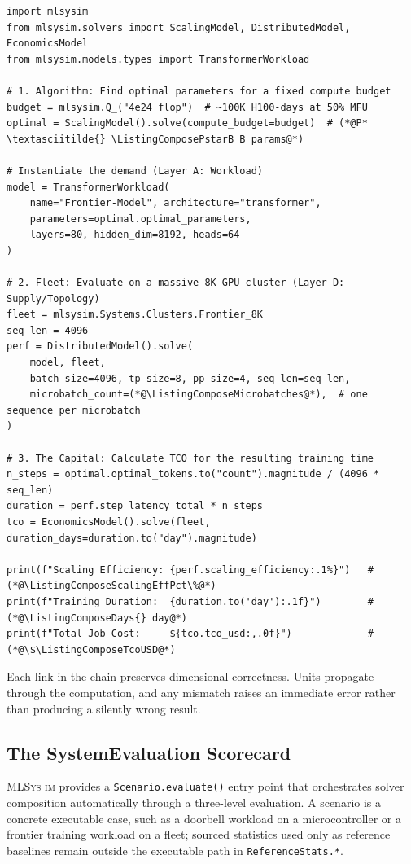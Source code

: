 \documentclass[10pt,twocolumn]{article}
\newcommand{\mlsysim}{\mbox{\textsc{MLSys}\,\textperiodcentered\,\textsc{im}}\xspace}
\begin{document}
\begin{lstlisting}[caption={\textbf{Solver Composition.} Bridging algorithmic scaling, distributed execution, and fleet economics in a single executable chain.},label={lst:composability},float=t]
import mlsysim
from mlsysim.solvers import ScalingModel, DistributedModel, EconomicsModel
from mlsysim.models.types import TransformerWorkload

# 1. Algorithm: Find optimal parameters for a fixed compute budget
budget = mlsysim.Q_("4e24 flop")  # ~100K H100-days at 50% MFU
optimal = ScalingModel().solve(compute_budget=budget)  # (*@P* \textasciitilde{} \ListingComposePstarB B params@*)

# Instantiate the demand (Layer A: Workload)
model = TransformerWorkload(
    name="Frontier-Model", architecture="transformer",
    parameters=optimal.optimal_parameters,
    layers=80, hidden_dim=8192, heads=64
)

# 2. Fleet: Evaluate on a massive 8K GPU cluster (Layer D: Supply/Topology)
fleet = mlsysim.Systems.Clusters.Frontier_8K
seq_len = 4096
perf = DistributedModel().solve(
    model, fleet,
    batch_size=4096, tp_size=8, pp_size=4, seq_len=seq_len,
    microbatch_count=(*@\ListingComposeMicrobatches@*),  # one sequence per microbatch
)

# 3. The Capital: Calculate TCO for the resulting training time
n_steps = optimal.optimal_tokens.to("count").magnitude / (4096 * seq_len)
duration = perf.step_latency_total * n_steps
tco = EconomicsModel().solve(fleet, duration_days=duration.to("day").magnitude)

print(f"Scaling Efficiency: {perf.scaling_efficiency:.1%}")   # (*@\ListingComposeScalingEffPct\%@*)
print(f"Training Duration:  {duration.to('day'):.1f}")        # (*@\ListingComposeDays{} day@*)
print(f"Total Job Cost:     ${tco.tco_usd:,.0f}")             # (*@\$\ListingComposeTcoUSD@*)
\end{lstlisting}

Each link in the chain preserves dimensional correctness. Units propagate through the computation, and any mismatch raises an immediate error rather than producing a silently wrong result.

\subsection{The SystemEvaluation Scorecard}
\label{sec:solvers-scorecard}

\mlsysim provides a \texttt{Scenario.evaluate()} entry point that orchestrates solver composition automatically through a three-level evaluation. A scenario is a concrete executable case, such as a doorbell workload on a microcontroller or a frontier training workload on a fleet; sourced statistics used only as reference baselines remain outside the executable path in \texttt{ReferenceStats.*}.
\end{document}
